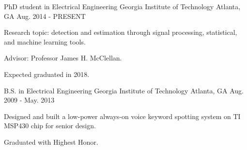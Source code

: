 

\begin{cventries}

  \cventry
    {PhD student in Electrical Engineering} %
    {Georgia Institute of Technology} %
    {Atlanta, GA} %
    {Aug. 2014 - PRESENT} %
    {
      \begin{cvitems} %
        \item {Research topic: detection and estimation through signal processing, statistical, and machine learning tools.}
        \item {Advisor: Professor James H. McClellan.}
        \item {Expected graduated in 2018.}
      \end{cvitems}
    }
    
  \cventry
    {B.S. in Electrical Engineering} %
    {Georgia Institute of Technology} %
    {Atlanta, GA} %
    {Aug. 2009 - May. 2013} %
    {
      \begin{cvitems} %
        \item {Designed and built a low-power always-on voice keyword spotting system on TI MSP430 chip for senior design.}
        \item {Graduated with Highest Honor.}
      \end{cvitems}
    }

\end{cventries}
